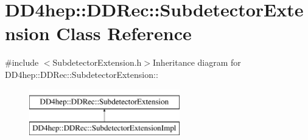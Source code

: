 \hypertarget{class_d_d4hep_1_1_d_d_rec_1_1_subdetector_extension}{
\section{DD4hep::DDRec::SubdetectorExtension Class Reference}
\label{class_d_d4hep_1_1_d_d_rec_1_1_subdetector_extension}
}


{\ttfamily \#include $<$SubdetectorExtension.h$>$}Inheritance diagram for DD4hep::DDRec::SubdetectorExtension::\begin{figure}[H]
\begin{center}
\leavevmode
\includegraphics[height=2cm]{class_d_d4hep_1_1_d_d_rec_1_1_subdetector_extension}
\end{center}
\end{figure}
